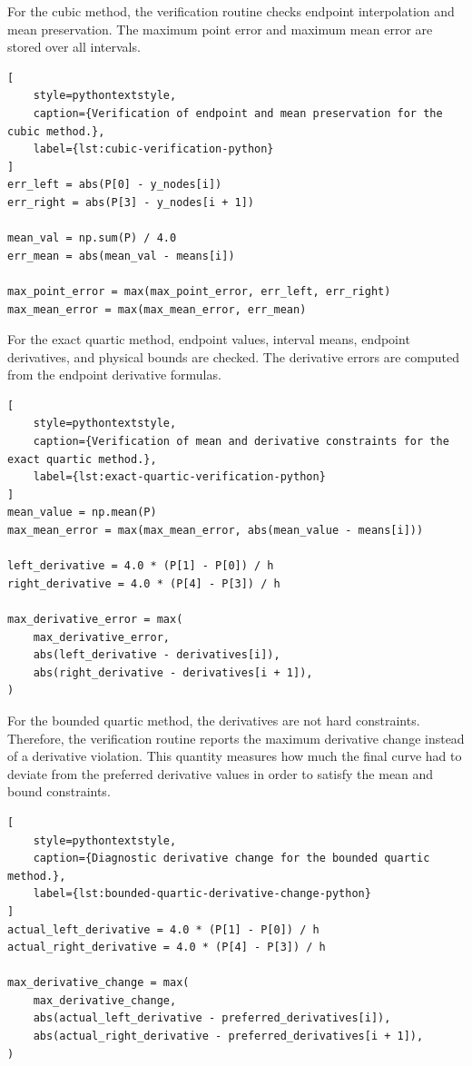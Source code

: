 \documentclass[12pt,a4paper]{article}
\begin{document}
For the cubic method, the verification routine checks endpoint interpolation
and mean preservation. The maximum point error and maximum mean error are
stored over all intervals.

\begin{lstlisting}[
    style=pythontextstyle,
    caption={Verification of endpoint and mean preservation for the cubic method.},
    label={lst:cubic-verification-python}
]
err_left = abs(P[0] - y_nodes[i])
err_right = abs(P[3] - y_nodes[i + 1])

mean_val = np.sum(P) / 4.0
err_mean = abs(mean_val - means[i])

max_point_error = max(max_point_error, err_left, err_right)
max_mean_error = max(max_mean_error, err_mean)
\end{lstlisting}

For the exact quartic method, endpoint values, interval means, endpoint
derivatives, and physical bounds are checked. The derivative errors are
computed from the endpoint derivative formulas.

\begin{lstlisting}[
    style=pythontextstyle,
    caption={Verification of mean and derivative constraints for the exact quartic method.},
    label={lst:exact-quartic-verification-python}
]
mean_value = np.mean(P)
max_mean_error = max(max_mean_error, abs(mean_value - means[i]))

left_derivative = 4.0 * (P[1] - P[0]) / h
right_derivative = 4.0 * (P[4] - P[3]) / h

max_derivative_error = max(
    max_derivative_error,
    abs(left_derivative - derivatives[i]),
    abs(right_derivative - derivatives[i + 1]),
)
\end{lstlisting}

For the bounded quartic method, the derivatives are not hard constraints.
Therefore, the verification routine reports the maximum derivative change
instead of a derivative violation. This quantity measures how much the final
curve had to deviate from the preferred derivative values in order to satisfy
the mean and bound constraints.

\begin{lstlisting}[
    style=pythontextstyle,
    caption={Diagnostic derivative change for the bounded quartic method.},
    label={lst:bounded-quartic-derivative-change-python}
]
actual_left_derivative = 4.0 * (P[1] - P[0]) / h
actual_right_derivative = 4.0 * (P[4] - P[3]) / h

max_derivative_change = max(
    max_derivative_change,
    abs(actual_left_derivative - preferred_derivatives[i]),
    abs(actual_right_derivative - preferred_derivatives[i + 1]),
)
\end{lstlisting}
\end{document}
